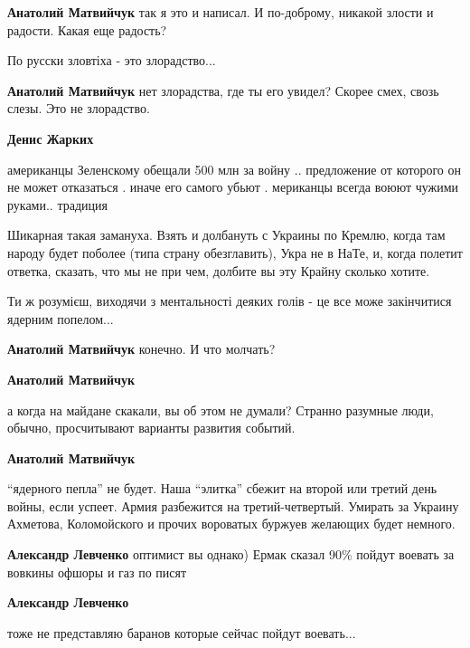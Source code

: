 \begin{itemize}
\begin{itemize} %
\textbf{Анатолий Матвийчук} так я это и написал. И по-доброму, никакой злости и радости. Какая еще радость?


По русски зловтіха - это злорадство...

\textbf{Анатолий Матвийчук} нет злорадства, где ты его увидел? Скорее смех, свозь слезы. Это не злорадство.

\textbf{Денис Жарких} 

американцы Зеленскому обещали 500 млн за войну .. предложение от которого он не
может отказаться . иначе его самого убьют . мериканцы всегда воюют чужими
руками.. традиция



Шикарная такая замануха. Взять и долбануть с Украины по Кремлю, когда там
народу будет поболее (типа страну обезглавить), Укра не в НаТе, и, когда
полетит ответка, сказать, что мы не при чем, долбите вы эту Крайну сколько
хотите.

\end{itemize} %


Ти ж розумієш, виходячи з ментальності деяких голів - це все може закінчитися
ядерним попелом...

\begin{itemize} %
\textbf{Анатолий Матвийчук} конечно. И что молчать?

\textbf{Анатолий Матвийчук} 

а когда на майдане скакали, вы об этом не думали? Странно разумные люди, обычно,
просчитывают варианты развития событий.


\textbf{Анатолий Матвийчук} 

\enquote{ядерного пепла} не будет. Наша \enquote{элитка} сбежит на второй или третий день
войны, если успеет. Армия разбежится на третий-четвертый. Умирать за Украину
Ахметова, Коломойского и прочих вороватых буржуев желающих будет немного.


\textbf{Александр Левченко} оптимист вы однако)
Ермак сказал 90\% пойдут воевать за вовкины офшоры и газ по писят

\textbf{Александр Левченко} 

тоже не представляю баранов которые сейчас пойдут воевать...


\end{itemize}
\end{itemize}
